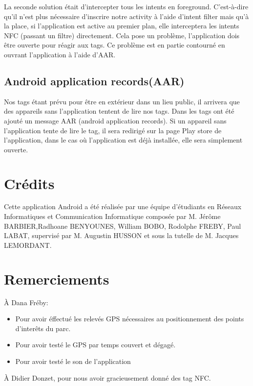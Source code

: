\documentclass[a4paper,11pt]{article}
\begin{document}
      La seconde solution était d’intercepter tous les intents en foreground. 
      C'est-à-dire qu’il n’est plus nécessaire d’inscrire notre activity à l’aide d’intent filter mais qu’à la place, 
      si l’application est active au premier plan, elle interceptera les intents NFC (passant un filtre) directement. 
      Cela pose un problème, l’application dois être ouverte pour réagir aux tags. 
      Ce problème est en partie contourné en ouvrant l’application à l’aide d’AAR.
      
      \subsection{Android application records(AAR)}
      Nos tags étant prévu pour être en extérieur dans un lieu public, il arrivera que des appareils sans l’application tentent de lire nos tags. 
      Dans les tags ont été ajouté un message AAR (android application records). 
      Si un appareil sans l’application tente de lire le tag, il sera redirigé sur la page Play store de l’application, 
      dans le cas où l’application est déjà installée, elle sera simplement ouverte.
    
    \section{Crédits}
		
    Cette application Android a été réalisée par une équipe d'étudiants en Réseaux Informatiques et Communication Informatique composée par 
    M. Jérôme BARBIER,Radhoane BENYOUNES, William BOBO, Rodolphe FREBY, Paul LABAT, supervisé par M. Augustin HUSSON et sous la tutelle 
    de M. Jacques LEMORDANT.

    \section{Remerciements}
    À Dana Fréby:
    \begin{itemize}
     \item Pour avoir éffectué les relevés GPS nécessaires au positionnement des points d'interêts du parc.
     \item Pour avoir testé le GPS par temps couvert et dégagé. 
     \item Pour avoir testé le son de l'application
    \end{itemize}
    
  À Didier Donzet, pour nous avoir gracieusement donné des tag NFC.
\end{document}
